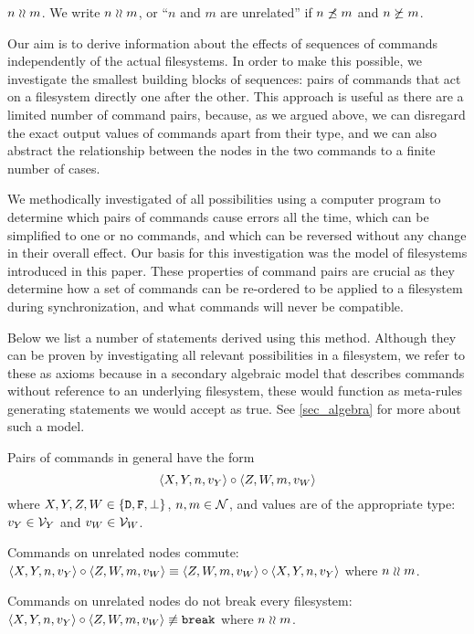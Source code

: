 \begin{mydef}{$n\mathrel{\wr\wr} m$.}
We write $n\mathrel{\wr\wr} m$, or ``$n$ and $m$ are unrelated'' if $n\not\preceq m$ and $n\not\succeq m$.
\end{mydef}


Our aim is to derive information about the effects of sequences
of commands independently of the actual filesystems.
In order to make this possible, we investigate the smallest building
blocks of sequences: pairs of commands that act on a filesystem directly one after the other.
This approach is useful as there are a limited number of command pairs,
because, as we argued above, we can disregard the exact output values of commands apart from their type,
and we can also abstract the relationship between the nodes in the two commands
to a finite number of cases.

We methodically investigated of all possibilities using a computer program
to determine
which pairs of commands cause errors all the time,
which can be simplified to one or no commands, and which can be reversed
without any change in their overall effect.
Our basis for this investigation was the model of filesystems introduced in this paper.
These properties of command pairs are crucial as they determine
how a set of commands can be re-ordered to be applied to a filesystem
during synchronization, and what commands will never be compatible.

Below we list a number of statements derived using this method.
Although they can be proven by investigating all relevant possibilities
in a filesystem, we refer to these as axioms because in a secondary algebraic model
that describes commands without reference to an underlying filesystem,
these would function as meta-rules generating statements we would accept as true.
See \cref{sec_algebra} for more about such a model.

\medskip

Pairs of commands in general have the form
\[ \langle{X,Y,n,v_Y}\rangle\circ  \langle{Z,W,m,v_W}\rangle \]
where $X,Y,Z,W\in\{\mathtt{D},\mathtt{F},\bot\}$, $n,m\in\mathcal{N}$, 
and values are of the appropriate type: 
$v_Y\in\mathcal{V}_{Y}$ and $v_W\in\mathcal{V}_{W}$.

\begin{myax}\label{ax_separate_commute}
Commands on unrelated nodes commute:
$\langle{X,Y,n,v_Y}\rangle\circ\langle{Z,W,m,v_W}\rangle \equiv \langle{Z,W,m,v_W}\rangle\circ\langle{X,Y,n,v_Y}\rangle$ where $n\mathrel{\wr\wr} m$.
\end{myax}

\begin{myax}\label{ax_separate_nobreaks}
Commands on unrelated nodes do not break every filesystem:
$\langle{X,Y,n,v_Y}\rangle\circ\langle{Z,W,m,v_W}\rangle \not\equiv \mathtt{break}$ where $n\mathrel{\wr\wr} m$.
\end{myax}

